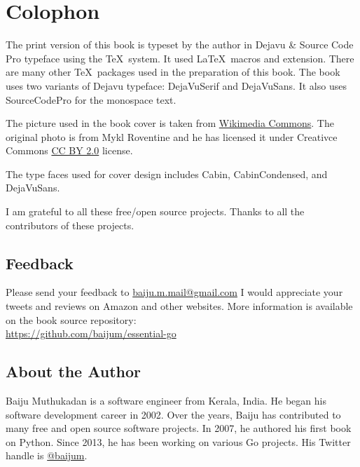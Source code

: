 \cleardoublepage
{}
\chapter*{Colophon}

The print version of this book is typeset by the author in Dejavu \&
Source Code Pro typeface using the
\TeX\ system.  It used \LaTeX\ macros and {} extension.
There are many other \TeX\ packages used in the preparation of this
book.  The book uses two variants of Dejavu typeface: DejaVuSerif and
DejaVuSans. It also uses SourceCodePro for the monospace text.

The picture used in the book cover is taken from
\href{https://commons.wikimedia.org/wiki/File:The_ladder_of_life_is_full_of_splinters.jpg}{Wikimedia Commons}.
The original photo is from Mykl Roventine and he has licensed it under
Creativce
Commons \href{https://creativecommons.org/licenses/by/2.0}{CC BY 2.0}
license.

The type faces used for cover design includes Cabin, CabinCondensed,
and DejaVuSans.


I am grateful to all these free/open source projects.  Thanks to all
the contributors of these projects.

\section*{Feedback}

Please send your feedback
to \href{mailto:baiju.m.mail@gmail.com}{baiju.m.mail@gmail.com} I would
appreciate your tweets and reviews on Amazon and other websites.  More
information is available on the book
source repository:\\ \url{https://github.com/baijum/essential-go}

\pagebreak
\thispagestyle{empty} %

\section*{About the Author}

Baiju Muthukadan is a software engineer from Kerala, India. He began his
software development career in 2002. Over the years, Baiju has contributed to
many free and open source software projects. In 2007, he authored his first book
on Python. Since 2013, he has been working on various Go projects. His Twitter
handle is \href{https://twitter.com/baijum}{@baijum}.
